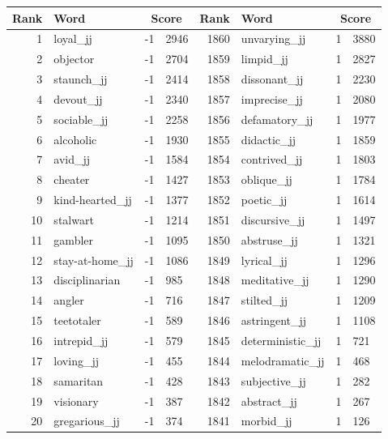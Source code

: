 \begin{table}[tbp]
    \begin{tabular}{| rlr@{.}l | rlr@{.}l |}
    \hline
    \textbf{Rank} & \textbf{Word} & \multicolumn{2}{c|}{\textbf{Score}} & \textbf{Rank} & \textbf{Word} & \multicolumn{2}{c|}{\textbf{Score}} \\
    \hline
    1 & loyal\_jj & -1 & 2946    &    1860 & unvarying\_jj & 1 & 3880 \\
    2 & objector & -1 & 2704    &    1859 & limpid\_jj & 1 & 2827 \\
    3 & staunch\_jj & -1 & 2414    &    1858 & dissonant\_jj & 1 & 2230 \\
    4 & devout\_jj & -1 & 2340    &    1857 & imprecise\_jj & 1 & 2080 \\
    5 & sociable\_jj & -1 & 2258    &    1856 & defamatory\_jj & 1 & 1977 \\
    6 & alcoholic & -1 & 1930    &    1855 & didactic\_jj & 1 & 1859 \\
    7 & avid\_jj & -1 & 1584    &    1854 & contrived\_jj & 1 & 1803 \\
    8 & cheater & -1 & 1427    &    1853 & oblique\_jj & 1 & 1784 \\
    9 & kind-hearted\_jj & -1 & 1377    &    1852 & poetic\_jj & 1 & 1614 \\
    10 & stalwart & -1 & 1214    &    1851 & discursive\_jj & 1 & 1497 \\
    11 & gambler & -1 & 1095    &    1850 & abstruse\_jj & 1 & 1321 \\
    12 & stay-at-home\_jj & -1 & 1086    &    1849 & lyrical\_jj & 1 & 1296 \\
    13 & disciplinarian & -1 & 985    &    1848 & meditative\_jj & 1 & 1290 \\
    14 & angler & -1 & 716    &    1847 & stilted\_jj & 1 & 1209 \\
    15 & teetotaler & -1 & 589    &    1846 & astringent\_jj & 1 & 1108 \\
    16 & intrepid\_jj & -1 & 579    &    1845 & deterministic\_jj & 1 & 721 \\
    17 & loving\_jj & -1 & 455    &    1844 & melodramatic\_jj & 1 & 468 \\
    18 & samaritan & -1 & 428    &    1843 & subjective\_jj & 1 & 282 \\
    19 & visionary & -1 & 387    &    1842 & abstract\_jj & 1 & 267 \\
    20 & gregarious\_jj & -1 & 374    &    1841 & morbid\_jj & 1 & 126 \\

\end{tabular}
\end{table}
